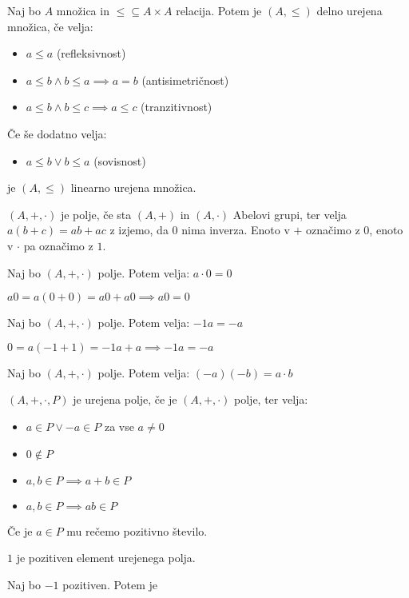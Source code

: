\begin{definicija}
    Naj bo $A$ množica in $\leq \subseteq A \times A$ relacija.
    Potem je $(A, \leq)$ delno urejena množica, če velja:
    \begin{itemize}
        \item $a \leq a$ (refleksivnost)
        \item $a \leq b \wedge b \leq a \implies a = b$ (antisimetričnost)
        \item $a \leq b \wedge b \leq c \implies a \leq c$ (tranzitivnost)
    \end{itemize}
    Če še dodatno velja:
    \begin{itemize}
        \item $a \leq b \vee b \leq a$ (sovisnost)
    \end{itemize}
    je $(A, \leq)$ linearno urejena množica.
\end{definicija}

\begin{definicija}
    $(A, +, \cdot)$ je polje, če sta $(A, +)$ in $(A, \cdot)$ Abelovi grupi, ter velja $a(b + c) = ab + ac$ z izjemo, da $0$ nima inverza.
    Enoto v $+$ označimo z $0$, enoto v $\cdot$ pa označimo z $1$.
\end{definicija}

\begin{trditev}
    Naj bo $(A, +, \cdot)$ polje.
    Potem velja: $a \cdot 0 = 0$
\end{trditev}
\begin{dokaz}
    $a0 = a(0 + 0) = a0 + a0 \implies a0 = 0$
\end{dokaz}

\begin{trditev}
    Naj bo $(A, +, \cdot)$ polje.
    Potem velja: $-1a = -a$
\end{trditev}
\begin{dokaz}
    $0 = a(-1 + 1) = -1a + a \implies -1a = -a$
\end{dokaz}

\begin{trditev}
    Naj bo $(A, +, \cdot)$ polje.
    Potem velja: $(-a)(-b) = a\cdot b$
\end{trditev}
\begin{dokaz}

\end{dokaz}

\begin{definicija}
    $(A, +, \cdot, P)$ je urejena polje, če je $(A, +, \cdot)$ polje, ter velja:
    \begin{itemize}
        \item $a \in P \vee -a \in P$ za vse $a \neq 0$
        \item $0 \notin P$
        \item $a, b \in P \implies a + b \in P$
        \item $a, b \in P \implies ab \in P$
    \end{itemize}
    Če je $a \in P$ mu rečemo pozitivno število.
\end{definicija}

\begin{trditev}
    $1$ je pozitiven element urejenega polja.
\end{trditev}
\begin{dokaz}
    Naj bo $-1$ pozitiven.
    Potem je
\end{dokaz}
